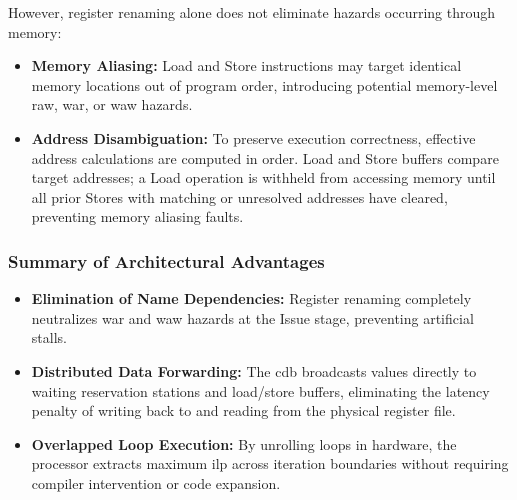 However, register renaming alone does not eliminate hazards occurring through memory:
\begin{itemize}
    \item \textbf{Memory Aliasing:} Load and Store instructions may target identical memory locations out of program order, introducing potential memory-level \gls{raw}, \gls{war}, or \gls{waw} hazards.
    \item \textbf{Address Disambiguation:} To preserve execution correctness, effective address calculations are computed in order. Load and Store buffers compare target addresses; a Load operation is withheld from accessing memory until all prior Stores with matching or unresolved addresses have cleared, preventing memory aliasing faults.
\end{itemize}

\subsubsection{Summary of Architectural Advantages}
\begin{itemize}
    \item \textbf{Elimination of Name Dependencies:} Register renaming completely neutralizes \gls{war} and \gls{waw} hazards at the Issue stage, preventing artificial stalls.
    \item \textbf{Distributed Data Forwarding:} The \gls{cdb} broadcasts values directly to waiting reservation stations and load/store buffers, eliminating the latency penalty of writing back to and reading from the physical register file.
    \item \textbf{Overlapped Loop Execution:} By unrolling loops in hardware, the processor extracts maximum \gls{ilp} across iteration boundaries without requiring compiler intervention or code expansion.
\end{itemize}

